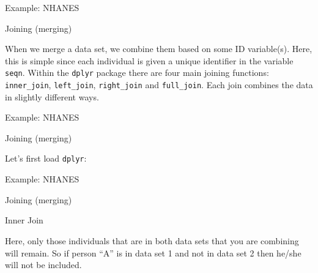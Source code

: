 \begin{frame}[fragile]{Example: NHANES}

\begin{block}{Joining (merging)}

When we merge a data set, we combine them based on some ID variable(s).
Here, this is simple since each individual is given a unique identifier
in the variable \texttt{seqn}. Within the \texttt{dplyr} package there
are four main joining functions: \texttt{inner\_join},
\texttt{left\_join}, \texttt{right\_join} and \texttt{full\_join}. Each
join combines the data in slightly different ways.

\end{block}

\end{frame}

\begin{frame}[fragile]{Example: NHANES}

\begin{block}{Joining (merging)}

Let's first load \texttt{dplyr}:

\begin{Shaded}
\begin{Highlighting}[]
\end{Highlighting}
\end{Shaded}

\end{block}

\end{frame}

\begin{frame}[fragile]{Example: NHANES}

\begin{block}{Joining (merging)}

\begin{block}{Inner Join}

Here, only those individuals that are in both data sets that you are
combining will remain. So if person ``A'' is in data set 1 and not in
data set 2 then he/she will not be included.

\begin{Shaded}
\begin{Highlighting}[]
\NormalTok{)}
\end{Highlighting}
\end{Shaded}

\end{block}

\end{block}

\end{frame}

